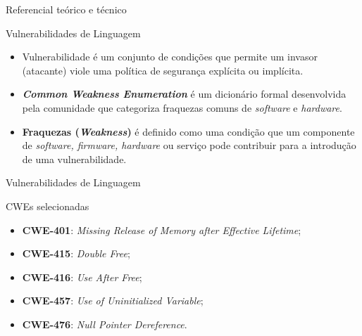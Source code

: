\documentclass[
    aspectratio=169,   %
    12pt,
    brazil
]{beamer}
\newcommand{\minhaspaginas}{}
\begin{document}
\renewcommand{\minhaspaginas}{\small 23 - 24}
\begin{frame}{Referencial teórico e técnico}
  \begin{block}{Vulnerabilidades de Linguagem}
    \begin{itemize}
      \item Vulnerabilidade é um conjunto de condições que permite um invasor (atacante) viole uma política de segurança explícita ou implícita.
      {\small \cite{seacord2013secure}}
    \item \textbf{\textit{Common Weakness Enumeration}} é um dicionário formal desenvolvida pela comunidade que categoriza fraquezas comuns de \textit{software} e \textit{hardware}.
    \item \textbf{Fraquezas (\textit{Weakness})} é definido como uma condição que um componente de \textit{software, firmware, hardware} ou serviço pode contribuir para a introdução de uma vulnerabilidade.
      {\small \cite{mitrecwe}}
    \end{itemize}
  \end{block}
\end{frame}

\begin{frame}{Vulnerabilidades de Linguagem}
  \begin{block}{CWEs selecionadas}
    \begin{itemize}
      \item \textbf{CWE-401}: \textit{Missing Release of Memory after Effective Lifetime}; 
      \item \textbf{CWE-415}: \textit{Double Free}; 
      \item \textbf{CWE-416}: \textit{Use After Free}; 
      \item \textbf{CWE-457}: \textit{Use of Uninitialized Variable};
      \item \textbf{CWE-476}: \textit{Null Pointer Dereference}.
    \end{itemize}
  \end{block}
\end{frame}
\end{document}
